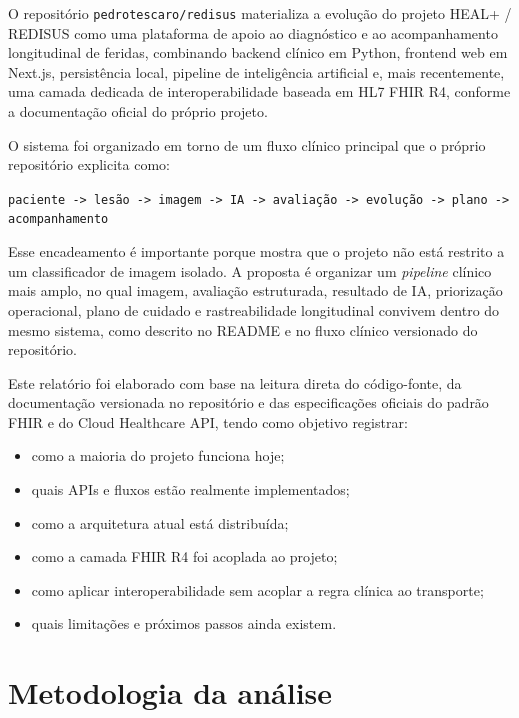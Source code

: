 \documentclass[
    12pt,
    openright,
    oneside,
    a4paper,
    chapter=TITLE,
    section=TITLE,
    brazil,
    sumario=tradicional,
    hidelinks
]{abntex2}
\begin{document}
O reposit\'orio \texttt{pedrotescaro/redisus} materializa a evolu\c{c}\~ao do projeto HEAL+ / REDISUS como uma plataforma de apoio ao diagn\'ostico e ao acompanhamento longitudinal de feridas, combinando backend cl\'inico em Python, frontend web em Next.js, persist\^encia local, pipeline de intelig\^encia artificial e, mais recentemente, uma camada dedicada de interoperabilidade baseada em HL7 FHIR R4, conforme a documenta\c{c}\~ao oficial do pr\'oprio projeto.

O sistema foi organizado em torno de um fluxo cl\'inico principal que o pr\'oprio reposit\'orio explicita como:

\begin{center}
\texttt{paciente -> les\~ao -> imagem -> IA -> avalia\c{c}\~ao -> evolu\c{c}\~ao -> plano -> acompanhamento}
\end{center}

Esse encadeamento \'e importante porque mostra que o projeto n\~ao est\'a restrito a um classificador de imagem isolado. A proposta \'e organizar um \textit{pipeline} cl\'inico mais amplo, no qual imagem, avalia\c{c}\~ao estruturada, resultado de IA, prioriza\c{c}\~ao operacional, plano de cuidado e rastreabilidade longitudinal convivem dentro do mesmo sistema, como descrito no README e no fluxo cl\'inico versionado do reposit\'orio.

Este relat\'orio foi elaborado com base na leitura direta do c\'odigo-fonte, da documenta\c{c}\~ao versionada no reposit\'orio e das especifica\c{c}\~oes oficiais do padr\~ao FHIR e do Cloud Healthcare API, tendo como objetivo registrar:

\begin{itemize}
    \item como a maioria do projeto funciona hoje;
    \item quais APIs e fluxos est\~ao realmente implementados;
    \item como a arquitetura atual est\'a distribu\'ida;
    \item como a camada FHIR R4 foi acoplada ao projeto;
    \item como aplicar interoperabilidade sem acoplar a regra cl\'inica ao transporte;
    \item quais limita\c{c}\~oes e pr\'oximos passos ainda existem.
\end{itemize}

\chapter{Metodologia da an\'alise}
\end{document}
